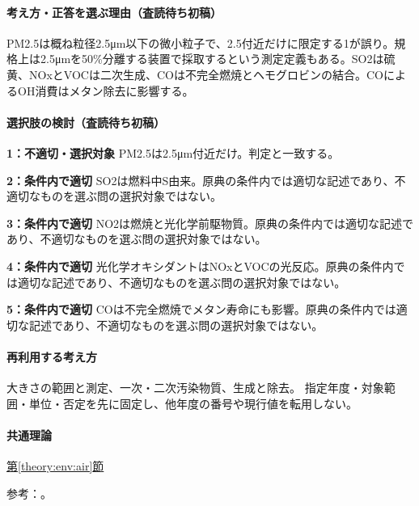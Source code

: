 \paragraph{考え方・正答を選ぶ理由（査読待ち初稿）} PM2.5は概ね粒径2.5μm以下の微小粒子で、2.5付近だけに限定する1が誤り。規格上は2.5μmを50\%分離する装置で採取するという測定定義もある。SO2は硫黄、NOxとVOCは二次生成、COは不完全燃焼とヘモグロビンの結合。COによるOH消費はメタン除去に影響する。

\paragraph{選択肢の検討（査読待ち初稿）}\mbox{}\par

\noindent\textbf{1：不適切・選択対象} PM2.5は2.5μm付近だけ。判定と一致する。\par

\noindent\textbf{2：条件内で適切} SO2は燃料中S由来。原典の条件内では適切な記述であり、不適切なものを選ぶ問の選択対象ではない。\par

\noindent\textbf{3：条件内で適切} NO2は燃焼と光化学前駆物質。原典の条件内では適切な記述であり、不適切なものを選ぶ問の選択対象ではない。\par

\noindent\textbf{4：条件内で適切} 光化学オキシダントはNOxとVOCの光反応。原典の条件内では適切な記述であり、不適切なものを選ぶ問の選択対象ではない。\par

\noindent\textbf{5：条件内で適切} COは不完全燃焼でメタン寿命にも影響。原典の条件内では適切な記述であり、不適切なものを選ぶ問の選択対象ではない。\par

\paragraph{再利用する考え方} 大きさの範囲と測定、一次・二次汚染物質、生成と除去。 指定年度・対象範囲・単位・否定を先に固定し、他年度の番号や現行値を転用しない。

\paragraph{共通理論} \hyperref[theory:env:air]{第\ref*{theory:env:air}節}

\par 参考：\cite{env58_pmstandard,env58_pm25}。

